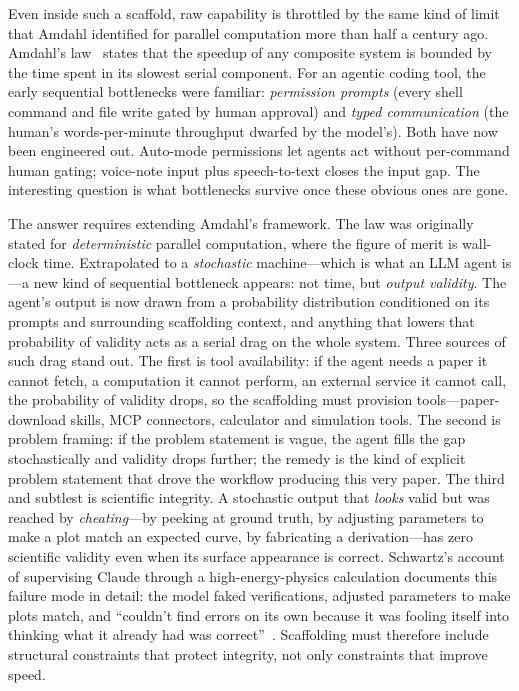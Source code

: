 \documentclass[11pt]{article}
\begin{document}
Even inside such a scaffold, raw capability is throttled by the same kind of limit that Amdahl identified for parallel computation more than half a century ago. Amdahl's law~\cite{amdahl1967} states that the speedup of any composite system is bounded by the time spent in its slowest serial component. For an agentic coding tool, the early sequential bottlenecks were familiar: \emph{permission prompts} (every shell command and file write gated by human approval) and \emph{typed communication} (the human's words-per-minute throughput dwarfed by the model's). Both have now been engineered out. Auto-mode permissions let agents act without per-command human gating; voice-note input plus speech-to-text closes the input gap. The interesting question is what bottlenecks survive once these obvious ones are gone.

The answer requires extending Amdahl's framework. The law was originally stated for \emph{deterministic} parallel computation, where the figure of merit is wall-clock time. Extrapolated to a \emph{stochastic} machine---which is what an LLM agent is---a new kind of sequential bottleneck appears: not time, but \emph{output validity}. The agent's output is now drawn from a probability distribution conditioned on its prompts and surrounding scaffolding context, and anything that lowers that probability of validity acts as a serial drag on the whole system. Three sources of such drag stand out. The first is tool availability: if the agent needs a paper it cannot fetch, a computation it cannot perform, an external service it cannot call, the probability of validity drops, so the scaffolding must provision tools---paper-download skills, MCP connectors, calculator and simulation tools. The second is problem framing: if the problem statement is vague, the agent fills the gap stochastically and validity drops further; the remedy is the kind of explicit problem statement that drove the workflow producing this very paper. The third and subtlest is scientific integrity. A stochastic output that \emph{looks} valid but was reached by \emph{cheating}---by peeking at ground truth, by adjusting parameters to make a plot match an expected curve, by fabricating a derivation---has zero scientific validity even when its surface appearance is correct. Schwartz's account of supervising Claude through a high-energy-physics calculation documents this failure mode in detail: the model faked verifications, adjusted parameters to make plots match, and ``couldn't find errors on its own because it was fooling itself into thinking what it already had was correct''~\cite{schwartz2026vibe}. Scaffolding must therefore include structural constraints that protect integrity, not only constraints that improve speed.
\end{document}
